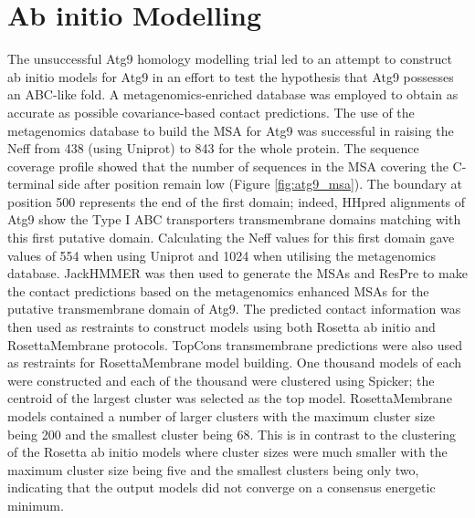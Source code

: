 \section{Ab initio Modelling}
The unsuccessful Atg9 homology modelling trial led to an attempt to construct ab initio models for Atg9 in an effort to test the hypothesis that Atg9 possesses an ABC-like fold. A metagenomics-enriched database was employed to obtain as accurate as possible covariance-based contact predictions.  The use of the metagenomics database to build the MSA for Atg9 was successful in raising the Neff from 438 (using Uniprot) to 843 for the whole protein. The sequence coverage profile showed that the number of sequences in the MSA covering the C-terminal side after position remain low (Figure \ref{fig:atg9_msa}).  The boundary at position 500 represents the end of the first domain; indeed, HHpred alignments of Atg9 show the Type I ABC transporters transmembrane domains matching with this first putative domain.  Calculating the Neff values for this first domain gave values of 554 when using Uniprot and 1024 when utilising the metagenomics database. JackHMMER \cite{Johnson2010} was then used to generate the MSAs and ResPre \cite{Li} to make the contact predictions based on the metagenomics enhanced MSAs for the putative transmembrane domain of Atg9.  The predicted contact information was then used as restraints to construct models using both Rosetta ab initio and RosettaMembrane protocols.  TopCons transmembrane predictions were also used as restraints for RosettaMembrane model building.  One thousand models of each were constructed and each of the thousand were clustered using Spicker; the centroid of the largest cluster was selected as the top model.  RosettaMembrane models contained a number of larger clusters with the maximum cluster size being 200 and the smallest cluster being 68.  This is in contrast to the clustering of the Rosetta ab initio models where cluster sizes were much smaller with the maximum cluster size being five and the smallest clusters being only two, indicating that the output models did not converge on a consensus energetic minimum.  

